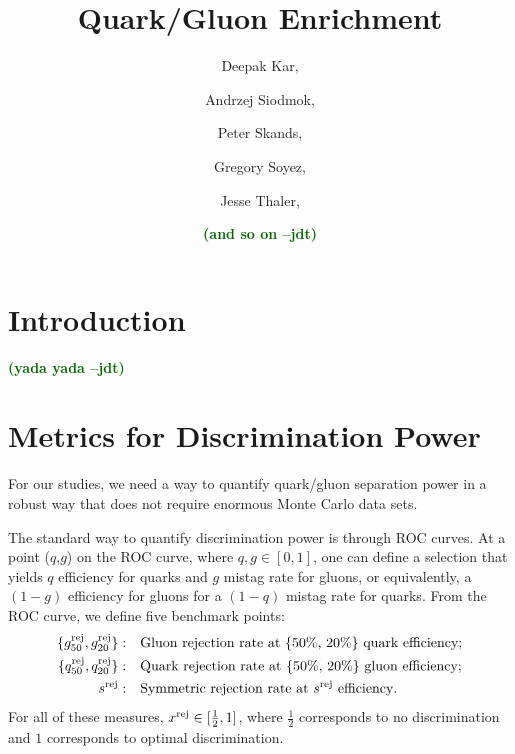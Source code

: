 \documentclass[11pt,letterpaper]{article}
\newcommand{\jdt}[1]{\textbf{\textcolor{darkgreen}{(#1 --jdt)}}}
\begin{document}
\title{Quark/Gluon Enrichment}
\author{Deepak Kar,}
\author{Andrzej Siodmok,}
\author{Peter Skands,}
\author{Gregory Soyez,}
\author[a]{Jesse Thaler,}
\author{\jdt{and so on}}





\maketitle

\section{Introduction}
\label{introduction}

\jdt{yada yada}

\section{Metrics for Discrimination Power}

For our studies, we need a way to quantify quark/gluon separation power in a robust way that does not require enormous Monte Carlo data sets.

The standard way to quantify discrimination power is through ROC curves.  At a point ($q$,$g$) on the ROC curve, where $q,g \in [0,1]$, one can define a selection that yields $q$ efficiency for quarks and $g$ mistag rate for gluons, or equivalently, a $(1-g)$ efficiency for gluons for a $(1-q)$ mistag rate for quarks.  From the ROC curve, we define five benchmark points:
\begin{align}
\{ g^{\rm  rej}_{50} ,   g^{\rm  rej}_{20}\} : \quad & \text{Gluon rejection rate at \{50\%, 20\%\} quark efficiency}; \\
\{q^{\rm rej}_{50} ,  q^{\rm rej}_{20}\} : \quad & \text{Quark rejection rate at \{50\%, 20\%\} gluon efficiency}; \\
s^{\rm rej} : \quad & \text{Symmetric rejection rate at $s^{\rm rej}$ efficiency}.
\end{align}
For all of these measures, $x^{\rm rej} \in [\frac{1}{2},1]$, where $\frac{1}{2}$ corresponds to no discrimination and $1$ corresponds to optimal discrimination.
\end{document}
